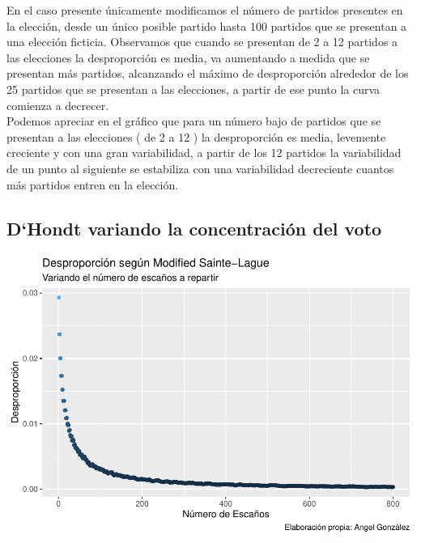 \documentclass[12pt,a4paper,]{book}
\numberwithin{dummy}{section}
\theoremstyle{ocrenumbox}
\theoremstyle{blacknumex}
\theoremstyle{blacknumbox}
\theoremstyle{ocrenum}
\theoremstyle{ocrenum}
\begin{document}
En el caso presente únicamente modificamos el número de partidos
presentes en la elección, desde un único posible partido hasta 100
partidos que se presentan a una elección ficticia. Observamos que cuando
se presentan de 2 a 12 partidos a las elecciones la desproporción es
media, va aumentando a medida que se presentan más partidos, alcanzando
el máximo de desproporción alrededor de los 25 partidos que se presentan
a las elecciones, a partir de ese punto la curva comienza a decrecer.\\
Podemos apreciar en el gráfico que para un número bajo de partidos que
se presentan a las elecciones ( de 2 a 12 ) la desproporción es media,
levemente creciente y con una gran variabilidad, a partir de los 12
partidos la variabilidad de un punto al siguiente se estabiliza con una
variabilidad decreciente cuantos más partidos entren en la elección.

\hypertarget{dhondt-variando-la-concentraciuxf3n-del-voto}{%
\subsection{D`Hondt variando la concentración del
voto}\label{dhondt-variando-la-concentraciuxf3n-del-voto}}

\begin{center}\includegraphics[width=0.95\linewidth]{figurasR/unnamed-chunk-15-1} \end{center}
\end{document}
